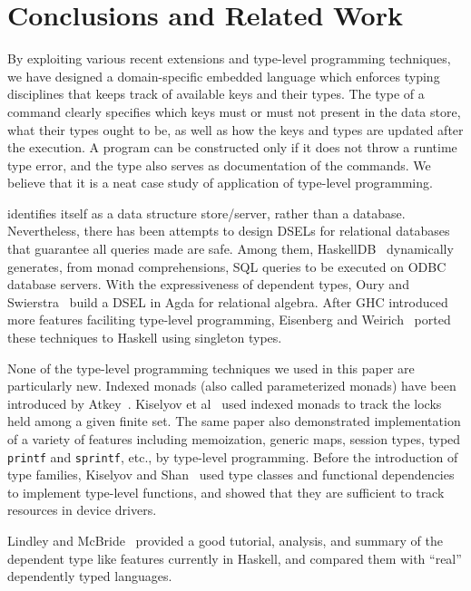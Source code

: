 
\section{Conclusions and Related Work}
\label{sec:conclusions}

By exploiting various recent extensions and type-level programming techniques,
we have designed a domain-specific embedded language \Edis{} which enforces
typing disciplines that keeps track of available keys and their types. The
type of a command clearly specifies which keys must or must not present in
the data store, what their types ought to be, as well as how the keys and types are updated after the execution. A program can be constructed only if it does
not throw a runtime type error, and the type also serves as documentation of the
commands. We believe that it is a neat case study of application of type-level programming.

\Redis{} identifies itself as a data structure store/server, rather than a
database. Nevertheless, there has been attempts to design DSELs for relational
databases that guarantee all queries made are safe. Among them, {\sc HaskellDB}~\cite{haskelldb,haskelldbimproved} dynamically generates, from monad comprehensions, SQL queries to be executed on ODBC database servers.
With the expressiveness of dependent types, Oury and Swierstra~\cite{pi}
build a DSEL in Agda for relational algebra. After GHC introduced more features
faciliting type-level programming, Eisenberg and Weirich~\cite{singletons}
ported these techniques to Haskell using singleton types.

None of the type-level programming techniques we used in this paper are
particularly new. Indexed monads (also called parameterized monads) have been
introduced by Atkey~\cite{indexedmonad}.
Kiselyov et al~\cite{typefun} used indexed monads to track the locks held among
a given finite set. The same paper also demonstrated implementation of a
variety of features including memoization, generic maps, session types, typed \texttt{printf} and \texttt{sprintf}, etc., by type-level programming.
Before the introduction of type families, Kiselyov and Shan~\cite{staticresources} used type classes and functional dependencies to
implement type-level functions, and showed that they are sufficient to track
resources in device drivers.

\cite{constraintskinds}

Lindley and McBride~\cite{phasedistinction} provided a good tutorial, analysis, and summary of the dependent type like features currently in Haskell, and
compared them with ``real'' dependently typed languages.
